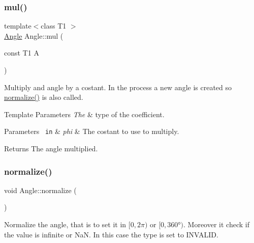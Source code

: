 \subsubsection{\texorpdfstring{mul()}{mul()}}
{\footnotesize\ttfamily template$<$class T1 $>$ \\
\mbox{\hyperlink{class_angle}{Angle}} Angle\+::mul (\begin{DoxyParamCaption}\item[{const T1}]{A }\end{DoxyParamCaption})\hspace{0.3cm}{\ttfamily [inline]}}



Multiply and angle by a costant. In the process a new angle is created so {\ttfamily \mbox{\hyperlink{class_angle_a449fc0638ca2e26b4a57d1cce95788e8}{normalize()}}} is also called. 


\begin{DoxyTemplParams}{Template Parameters}
{\em The} & type of the coefficient. \\
\hline
\end{DoxyTemplParams}

\begin{DoxyParams}[1]{Parameters}
\mbox{\texttt{ in}}  & {\em phi} & The costant to use to multiply. \\
\hline
\end{DoxyParams}
\begin{DoxyReturn}{Returns}
The angle multiplied. 
\end{DoxyReturn}
\mbox{\label{class_angle_a449fc0638ca2e26b4a57d1cce95788e8}} 
\subsubsection{\texorpdfstring{normalize()}{normalize()}}
{\footnotesize\ttfamily void Angle\+::normalize (\begin{DoxyParamCaption}{ }\end{DoxyParamCaption})\hspace{0.3cm}{\ttfamily [inline]}}



Normalize the angle, that is to set it in $[0, 2\pi)$ or $[0, 360°)$. Moreover it check if the value is infinite or NaN. In this case the {\ttfamily type} is set to {\ttfamily I\+N\+V\+A\+L\+ID}. 

\mbox{\label{class_angle_ab50d514ec9f24c0b65d37f174cbff780}} 
